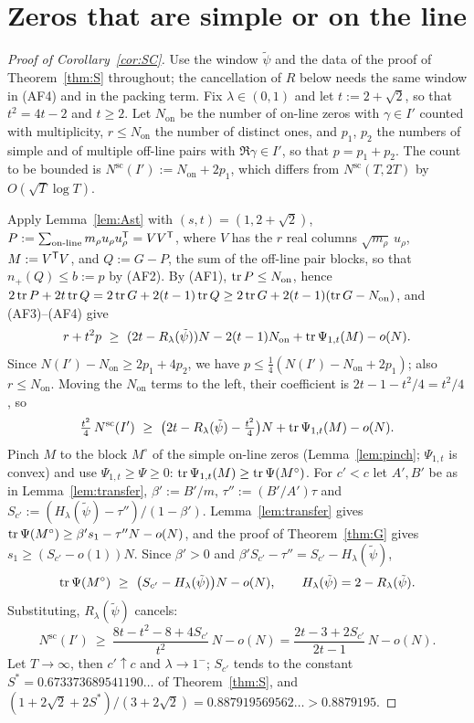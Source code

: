\section{Zeros that are simple or on the line}\label{sec:sc}

\begin{proof}[Proof of Corollary~\ref{cor:SC}]
Use the window $\tilde\psi$ and the data of the proof of Theorem~\ref{thm:S} throughout; the cancellation of $R$ below needs the same window in
(AF4) and in the packing term. Fix $\lambda\in(0,1)$ and let $t:=2+\sqrt2$, so that $t^2=4t-2$ and $t\ge2$. Let $N_{\mathrm{on}}$ be the number of
on-line zeros with $\gamma\in I'$ counted with multiplicity, $r\le N_{\mathrm{on}}$ the number of distinct ones, and $p_1$, $p_2$ the numbers of
simple and of multiple off-line pairs with $\Re\gamma\in I'$, so that $p=p_1+p_2$. The count to be bounded is $N^{\mathrm{sc}}(I'):=N_{\mathrm{on}}+2p_1$,
which differs from $N^{\mathrm{sc}}(T,2T)$ by $O(\sqrt T\log T)$.

Apply Lemma~\ref{lem:Ast} with $(s,t)=(1,2+\sqrt2)$, $P:=\sum_{\text{on-line}}m_\rho u_\rho u_\rho^{\mathsf T}=VV^{\mathsf T}$, where $V$ has the $r$ real columns
$\sqrt{m_\rho}\,u_\rho$, $M:=V^{\mathsf T}V$, and $Q:=G-P$, the sum of the off-line pair blocks, so that $n_+(Q)\le b:=p$ by (AF2). By (AF1),
$\operatorname{tr} P\le N_{\mathrm{on}}$, hence $2\operatorname{tr} P+2t\operatorname{tr} Q=2\operatorname{tr} G+2(t-1)\operatorname{tr} Q\ge2\operatorname{tr} G+2(t-1)(\operatorname{tr} G-N_{\mathrm{on}})$, and (AF3)--(AF4) give
\[
r+t^2p\ \ge\ (2t-R_\lambda(\tilde\psi))N-2(t-1)N_{\mathrm{on}}+\tr\Psi_{1,t}(M)-o(N).
\]
Since $N(I')-N_{\mathrm{on}}\ge2p_1+4p_2$, we have $p\le\frac14(N(I')-N_{\mathrm{on}}+2p_1)$; also $r\le N_{\mathrm{on}}$. Moving the
$N_{\mathrm{on}}$ terms to the left, their coefficient is $2t-1-t^2/4=t^2/4$, so
\[
\tfrac{t^2}4\,N^{\mathrm{sc}}(I')\ \ge\ \big(2t-R_\lambda(\tilde\psi)-\tfrac{t^2}4\big)N+\tr\Psi_{1,t}(M)-o(N).
\]
Pinch $M$ to the block $M^\circ$ of the simple on-line zeros (Lemma~\ref{lem:pinch}; $\Psi_{1,t}$ is convex) and use $\Psi_{1,t}\ge\Psi\ge0$:
$\operatorname{tr}\Psi_{1,t}(M)\ge\operatorname{tr}\Psi(M^\circ)$. For $c'<c$ let $A',B'$ be as in Lemma~\ref{lem:transfer}, $\beta':=B'/m$, $\tau'':=(B'/A')\tau$ and
$S_{c'}:=(H_\lambda(\tilde\psi)-\tau'')/(1-\beta')$. Lemma~\ref{lem:transfer} gives $\operatorname{tr}\Psi(M^\circ)\ge\beta's_1-\tau''N-o(N)$, and the proof of
Theorem~\ref{thm:G} gives $s_1\ge(S_{c'}-o(1))N$. Since $\beta'>0$ and $\beta'S_{c'}-\tau''=S_{c'}-H_\lambda(\tilde\psi)$,
\[
\tr\Psi(M^\circ)\ \ge\ \big(S_{c'}-H_\lambda(\tilde\psi)\big)N-o(N),\qquad H_\lambda(\tilde\psi)=2-R_\lambda(\tilde\psi).
\]
Substituting, $R_\lambda(\tilde\psi)$ cancels:
\[
N^{\mathrm{sc}}(I')\ \ge\ \frac{8t-t^2-8+4S_{c'}}{t^2}\,N-o(N)=\frac{2t-3+2S_{c'}}{2t-1}\,N-o(N).
\]
Let $T\to\infty$, then $c'\uparrow c$ and $\lambda\to1^-$; $S_{c'}$ tends to the constant $S^*=0.673373689541190\ldots$ of Theorem~\ref{thm:S}, and
$(1+2\sqrt2+2S^*)/(3+2\sqrt2)=0.887919569562\ldots>0.8879195$.
\end{proof}

